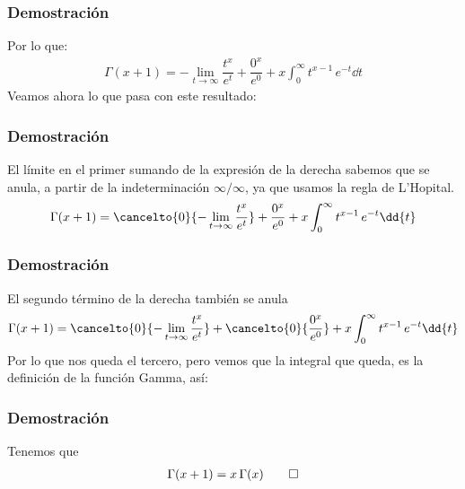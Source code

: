 \begin{frame}
\frametitle{Demostración}
Por lo que:
\begin{align*}
\Gamma (x + 1) = - \lim_{t \to \infty} \dfrac{t^{x}}{e^t} + \dfrac{0^{x}}{e^{0}} + x \int_{0}^{\infty} t^{x-1} \, e^{-t} \dd{t}
\end{align*}
\pause
Veamos ahora lo que pasa con este resultado:
\end{frame}
\begin{frame}
\frametitle{Demostración}
El límite en el primer sumando de la expresión de la derecha sabemos que se anula, a partir de la indeterminación $\infty / \infty$, ya que usamos la regla de L'Hopital.
\begin{align*}
\Gamma (x + 1) = \cancelto{0}{- \lim_{t \to \infty} \dfrac{t^{x}}{e^t}} + \dfrac{0^{x}}{e^{0}} + x \int_{0}^{\infty} t^{x-1} \, e^{-t} \dd{t}
\end{align*}
\end{frame}
\begin{frame}
\frametitle{Demostración}
El segundo término de la derecha también se anula
\begin{align*}
\Gamma (x + 1) = \cancelto{0}{- \lim_{t \to \infty} \dfrac{t^{x}}{e^t}} + \cancelto{0}{\dfrac{0^{x}}{e^{0}}} + x \int_{0}^{\infty} t^{x-1} \, e^{-t} \dd{t}
\end{align*}
\pause
Por lo que nos queda el tercero, pero vemos que la integral que queda, es la definición de la función Gamma, así:
\end{frame}
\begin{frame}
\frametitle{Demostración}
Tenemos que
\begin{align*}
\Gamma (x + 1) = x \, \Gamma (x) \qed
\end{align*}
\end{frame}
